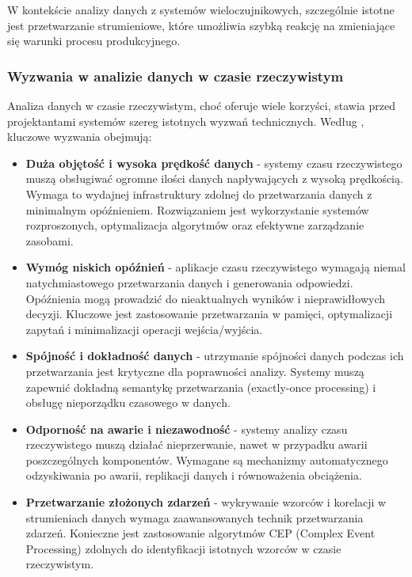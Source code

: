 W kontekście analizy danych z systemów wieloczujnikowych, szczególnie istotne jest przetwarzanie strumieniowe, które umożliwia szybką reakcję na zmieniające się warunki procesu produkcyjnego.

\subsubsection{Wyzwania w analizie danych w czasie rzeczywistym}
\label{subsubsec:wyzwania_analizy_rt}

Analiza danych w czasie rzeczywistym, choć oferuje wiele korzyści, stawia przed projektantami systemów szereg istotnych wyzwań technicznych. Według \cite{geeksforgeeks_realtime}, kluczowe wyzwania obejmują:

\begin{itemize}
    \item \textbf{Duża objętość i wysoka prędkość danych} - systemy czasu rzeczywistego muszą obsługiwać ogromne ilości danych napływających z wysoką prędkością. Wymaga to wydajnej infrastruktury zdolnej do przetwarzania danych z minimalnym opóźnieniem. Rozwiązaniem jest wykorzystanie systemów rozproszonych, optymalizacja algorytmów oraz efektywne zarządzanie zasobami.
    
    \item \textbf{Wymóg niskich opóźnień} - aplikacje czasu rzeczywistego wymagają niemal natychmiastowego przetwarzania danych i generowania odpowiedzi. Opóźnienia mogą prowadzić do nieaktualnych wyników i nieprawidłowych decyzji. Kluczowe jest zastosowanie przetwarzania w pamięci, optymalizacji zapytań i minimalizacji operacji wejścia/wyjścia.
    
    \item \textbf{Spójność i dokładność danych} - utrzymanie spójności danych podczas ich przetwarzania jest krytyczne dla poprawności analizy. Systemy muszą zapewnić dokładną semantykę przetwarzania (exactly-once processing) i obsługę nieporządku czasowego w danych.
    
    \item \textbf{Odporność na awarie i niezawodność} - systemy analizy czasu rzeczywistego muszą działać nieprzerwanie, nawet w przypadku awarii poszczególnych komponentów. Wymagane są mechanizmy automatycznego odzyskiwania po awarii, replikacji danych i równoważenia obciążenia.
    
    \item \textbf{Przetwarzanie złożonych zdarzeń} - wykrywanie wzorców i korelacji w strumieniach danych wymaga zaawansowanych technik przetwarzania zdarzeń. Konieczne jest zastosowanie algorytmów CEP (Complex Event Processing) zdolnych do identyfikacji istotnych wzorców w czasie rzeczywistym.
    

\end{itemize}
